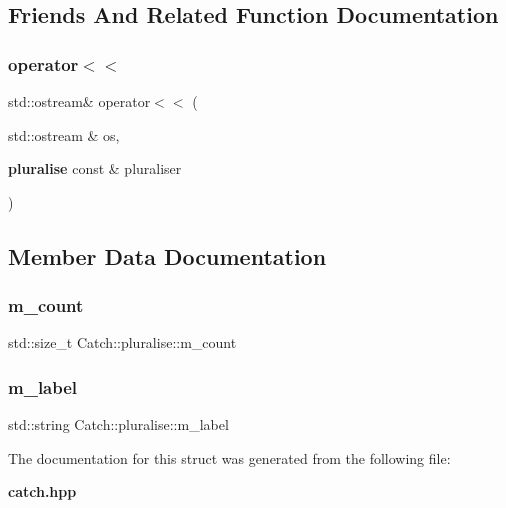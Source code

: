 \subsection{Friends And Related Function Documentation}
\mbox{\label{struct_catch_1_1pluralise_aa7dac6b165514c1f85e0695d678fdef5}} 
\subsubsection{operator$<$$<$}
{\footnotesize\ttfamily std\+::ostream\& operator$<$$<$ (\begin{DoxyParamCaption}\item[{std\+::ostream \&}]{os,  }\item[{\textbf{ pluralise} const \&}]{pluraliser }\end{DoxyParamCaption})\hspace{0.3cm}{\ttfamily [friend]}}



\subsection{Member Data Documentation}
\mbox{\label{struct_catch_1_1pluralise_a4dce2fa13ec6f00fac09b2418265441e}} 
\subsubsection{m\+\_\+count}
{\footnotesize\ttfamily std\+::size\+\_\+t Catch\+::pluralise\+::m\+\_\+count}

\mbox{\label{struct_catch_1_1pluralise_a8849cbdd3f11ebe7747597c8644e8793}} 
\subsubsection{m\+\_\+label}
{\footnotesize\ttfamily std\+::string Catch\+::pluralise\+::m\+\_\+label}



The documentation for this struct was generated from the following file\+:\begin{DoxyCompactItemize}
\item 
\textbf{ catch.\+hpp}\end{DoxyCompactItemize}
